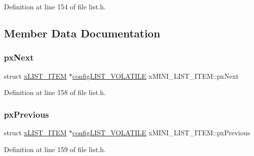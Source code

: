 Definition at line 154 of file list.\+h.



\subsection{Member Data Documentation}
\mbox{\label{structx_m_i_n_i___l_i_s_t___i_t_e_m_aa72fe4dc8dbfc53931f10ea54e6eaa5d}} 
\subsubsection{\texorpdfstring{px\+Next}{pxNext}}
{\footnotesize\ttfamily struct \hyperlink{structx_l_i_s_t___i_t_e_m}{x\+L\+I\+S\+T\+\_\+\+I\+T\+EM} $\ast$\hyperlink{vendor_2ceedling_2plugins_2freertos_2vendor_2freertos_2include_2list_8h_a2d5de557c5561c8980d1bf51d87d8cba}{config\+L\+I\+S\+T\+\_\+\+V\+O\+L\+A\+T\+I\+LE} x\+M\+I\+N\+I\+\_\+\+L\+I\+S\+T\+\_\+\+I\+T\+E\+M\+::px\+Next}



Definition at line 158 of file list.\+h.

\mbox{\label{structx_m_i_n_i___l_i_s_t___i_t_e_m_aebf56b558e5970205c2f477154083a57}} 
\subsubsection{\texorpdfstring{px\+Previous}{pxPrevious}}
{\footnotesize\ttfamily struct \hyperlink{structx_l_i_s_t___i_t_e_m}{x\+L\+I\+S\+T\+\_\+\+I\+T\+EM} $\ast$\hyperlink{vendor_2ceedling_2plugins_2freertos_2vendor_2freertos_2include_2list_8h_a2d5de557c5561c8980d1bf51d87d8cba}{config\+L\+I\+S\+T\+\_\+\+V\+O\+L\+A\+T\+I\+LE} x\+M\+I\+N\+I\+\_\+\+L\+I\+S\+T\+\_\+\+I\+T\+E\+M\+::px\+Previous}



Definition at line 159 of file list.\+h.

